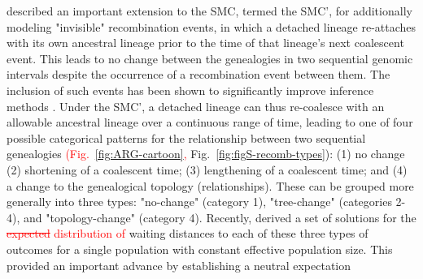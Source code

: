 \documentclass[11pt]{article}
\begin{document}
\cite{marjoram2006fast}
described an important extension to the SMC, termed the SMC', for additionally
modeling "invisible" recombination events, in which a detached lineage re-attaches
with its own ancestral lineage prior to the time of that lineage's next coalescent event. 
This leads to no change between the genealogies in two sequential genomic intervals
despite the occurrence of a recombination event between them. The inclusion of
such events has been shown to 
significantly improve inference methods \citep{wilton2015smc}. 
Under the SMC', a detached lineage can thus re-coalesce with an allowable 
ancestral lineage over a continuous range of time, leading to one of 
four possible categorical patterns for the relationship between two
sequential genealogies
\textcolor{red}{(Fig.~\ref{fig:ARG-cartoon},} Fig.~\ref{fig:figS-recomb-types}): 
(1) no change %
(2) shortening of a coalescent time; (3) lengthening of a coalescent time; 
and (4) %
a change to the genealogical topology (relationships).
These can be grouped more generally into three types: 
"no-change" (category 1), "tree-change" (categories 2-4), and "topology-change"
(category 4). Recently, \citet{deng_distribution_2021} derived a set of 
solutions for the 
\textcolor{red}{\sout{expected} distribution of} 
waiting distances to each of these three types of 
outcomes for a single population with constant effective population size.
% 
% 
This provided an important advance by establishing a neutral expectation 
\end{document}
